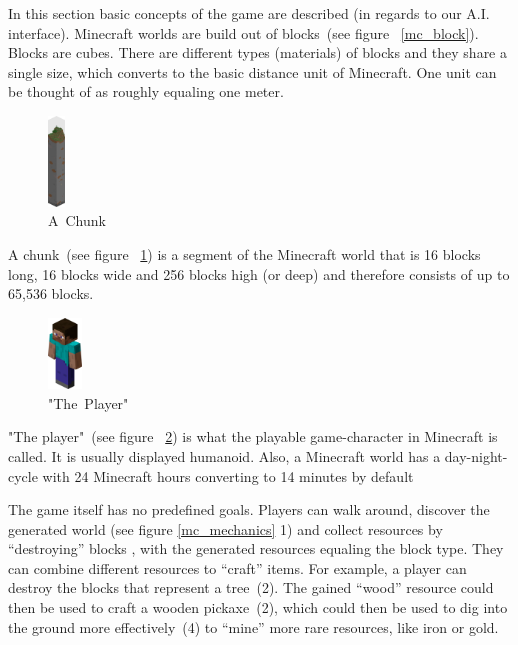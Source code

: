 In this section basic concepts of the game are described (in regards to our A.I. interface). Minecraft worlds are build out of blocks~(see figure ~\ref{mc_block}). Blocks are cubes. There are different types (materials) of blocks and they share a single size, which converts to the basic distance unit of Minecraft. One unit can be thought of as roughly equaling one meter.

\begin{figure}
  \begin{center}
    \includegraphics[width=0.04\textwidth]{graphics/chunk}
  \end{center}
  \caption{A~Chunk~\cite{image_mob}}
  \label{mc_chunk}
\end{figure}  

A chunk~(see figure ~\ref{mc_chunk}) is a segment of the Minecraft world that is 16 blocks long, 16 blocks wide and 256 blocks high (or deep) and therefore consists of up to 65,536 blocks.~\cite{mcwiki_chunks}

\begin{figure}
  \begin{center}
    \includegraphics[width=0.08\textwidth]{graphics/player}
  \end{center}
  \caption{"The~Player"~\cite{image_mob}}
  \label{mc_player}
\end{figure} 

"The player"~(see figure ~\ref{mc_player}) is what the playable game-character in Minecraft is called. It is usually displayed humanoid.
Also, a Minecraft world has a day-night-cycle with 24 Minecraft hours converting to 14 minutes by default

The game itself has no predefined goals. Players can walk around, discover the generated world (see figure \ref{mc_mechanics} 1) and collect resources by ``destroying'' blocks , with the generated resources equaling the block type. They can combine different resources to ``craft'' items. For example, a player can destroy the blocks that represent a tree~(2). The gained ``wood'' resource could then be used to craft a wooden pickaxe~(2), which could then be used to dig into the ground more effectively~(4) to ``mine'' more rare resources, like iron or gold.

